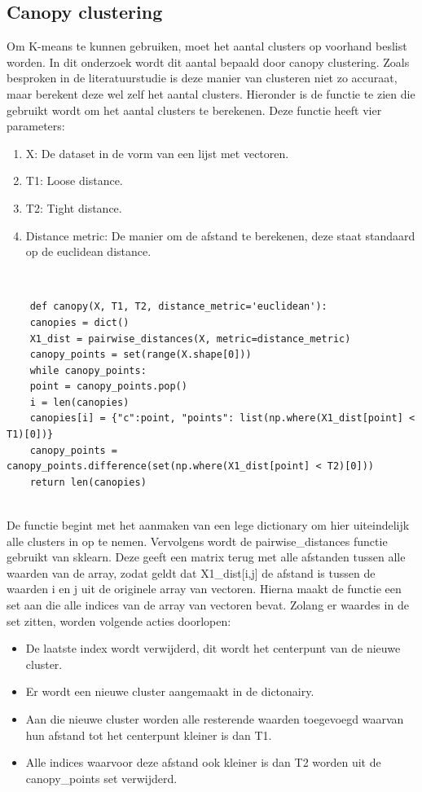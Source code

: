 \subsection{Canopy clustering}
Om K-means te kunnen gebruiken, moet het aantal clusters op voorhand beslist worden. In dit onderzoek wordt dit aantal bepaald door canopy clustering. Zoals besproken in de literatuurstudie is deze manier van clusteren niet zo accuraat, maar berekent deze wel zelf het aantal clusters. Hieronder is de functie te zien die gebruikt wordt om het aantal clusters te berekenen. Deze functie heeft vier parameters:
\begin{enumerate}
    \item X: De dataset in de vorm van een lijst met vectoren.
    \item T1: Loose distance.
    \item T2: Tight distance.
    \item Distance metric: De manier om de afstand te berekenen, deze staat standaard op de euclidean distance.
\end{enumerate}
\\\indent
\begin{lstlisting}
    def canopy(X, T1, T2, distance_metric='euclidean'):
    canopies = dict()
    X1_dist = pairwise_distances(X, metric=distance_metric)
    canopy_points = set(range(X.shape[0]))
    while canopy_points:
    point = canopy_points.pop()
    i = len(canopies)
    canopies[i] = {"c":point, "points": list(np.where(X1_dist[point] < T1)[0])}
    canopy_points = canopy_points.difference(set(np.where(X1_dist[point] < T2)[0]))
    return len(canopies)
\end{lstlisting}
\\\indent
De functie begint met het aanmaken van een lege dictionary om hier uiteindelijk alle clusters in op te nemen. Vervolgens wordt de pairwise\_distances functie gebruikt van sklearn. Deze geeft een matrix terug met alle afstanden tussen alle waarden van de array, zodat geldt dat X1\_dist[i,j] de afstand is tussen de waarden i en j uit de originele array van vectoren. Hierna maakt de functie een set aan die alle indices van de array van vectoren bevat. Zolang er waardes in de set zitten, worden volgende acties doorlopen:
\begin{itemize}
    \item De laatste index wordt verwijderd, dit wordt het centerpunt van de nieuwe cluster.
    \item Er wordt een nieuwe cluster aangemaakt in de dictonairy.
    \item Aan die nieuwe cluster worden alle resterende waarden toegevoegd waarvan hun afstand tot het centerpunt kleiner is dan T1.
    \item Alle indices waarvoor deze afstand ook kleiner is dan T2 worden uit de canopy\_points set verwijderd.
\end{itemize}
